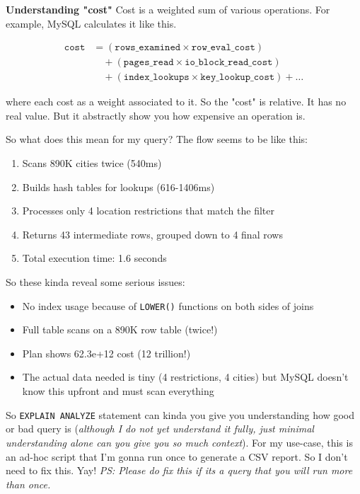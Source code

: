 \documentclass[11pt]{article}
\begin{document}
\noindent\makebox[\linewidth]{\rule{\paperwidth}{0.4pt}}
\textbf{Understanding "cost"}
Cost is a weighted sum of various operations. For example, MySQL calculates it like this.

\begin{align*}
\texttt{cost} &= (\texttt{rows\_examined} \times \texttt{row\_eval\_cost}) \\
&\quad + (\texttt{pages\_read} \times \texttt{io\_block\_read\_cost}) \\
&\quad + (\texttt{index\_lookups} \times \texttt{key\_lookup\_cost}) + \ldots
\end{align*}

where each cost as a weight associated to it. So the "cost" is relative. It has no real value. But it abstractly show you how expensive an operation is.

\noindent\makebox[\linewidth]{\rule{\paperwidth}{0.4pt}}

So what does this mean for my query? The flow seems to be like this:
\begin{enumerate}
    \item Scans 890K cities twice (540ms)
    \item Builds hash tables for lookups (616-1406ms)
    \item Processes only 4 location restrictions that match the filter
    \item Returns 43 intermediate rows, grouped down to 4 final rows
    \item Total execution time: 1.6 seconds
\end{enumerate}


So these kinda reveal some serious issues:
\begin{itemize}
    \item No index usage because of \texttt{LOWER()} functions on both sides of joins
    \item Full table scans on a 890K row table (twice!)
    \item Plan shows 62.3e+12 cost (12 trillion!)
    \item The actual data needed is tiny (4 restrictions, 4 cities) but MySQL doesn't know this upfront and must scan everything
\end{itemize}

So \texttt{EXPLAIN ANALYZE} statement can kinda you give you understanding how good or bad query is (\textit{although I do not yet understand it fully, just minimal understanding alone can you give you so much context}). For my use-case, this is an ad-hoc script that I'm gonna run once to generate a CSV report. So I don't need to fix this. Yay! \textit{PS: Please do fix this if its a query that you will run more than once.}
\end{document}
